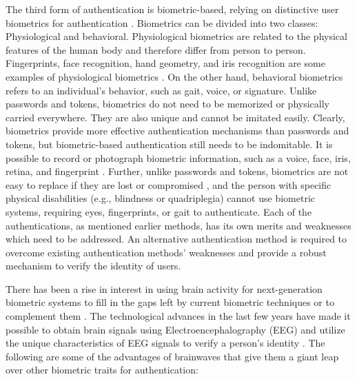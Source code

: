 The third form of authentication is biometric-based, relying on distinctive user biometrics for authentication \cite{o2003comparing}. Biometrics can be divided into two classes: Physiological and behavioral. Physiological biometrics are related to the physical features of the human body and therefore differ from person to person. Fingerprints, face recognition, hand geometry, and iris recognition are some examples of physiological biometrics \cite{bhattacharyya2009biometric}. On the other hand, behavioral biometrics refers to an individual's behavior, such as gait, voice, or signature. Unlike passwords and tokens, biometrics do not need to be memorized or physically carried everywhere. They are also unique and cannot be imitated easily. Clearly, biometrics provide more effective authentication mechanisms than passwords and tokens, but biometric-based authentication still needs to be indomitable.  
It is possible to record or photograph biometric information, such as a voice, face, iris, retina, and fingerprint \cite{authentication_definition}. Further, unlike passwords and tokens, biometrics are not easy to replace if they are lost or compromised \cite{o2003comparing}, and the person with specific physical disabilities (e.g., blindness or quadriplegia) cannot use biometric systems, requiring eyes, fingerprints, or gait to authenticate. Each of the authentications, as mentioned earlier methods, has its own merits and weaknesses which need to be addressed. An alternative authentication method is required to overcome existing authentication methods' weaknesses and provide a robust mechanism to verify the identity of users. \smallskip

There has been a rise in interest in using brain activity for next-generation biometric systems to fill in the gaps left by current biometric techniques or
to complement them \cite{arias2021inexpensive}. The technological advances in the last few years have made it possible to obtain brain signals using Electroencephalography (EEG) and utilize the unique characteristics of EEG signals to verify a person's identity \cite{la2014human}. The following are some of the advantages of brainwaves that give them a giant leap over other biometric traits for authentication:

